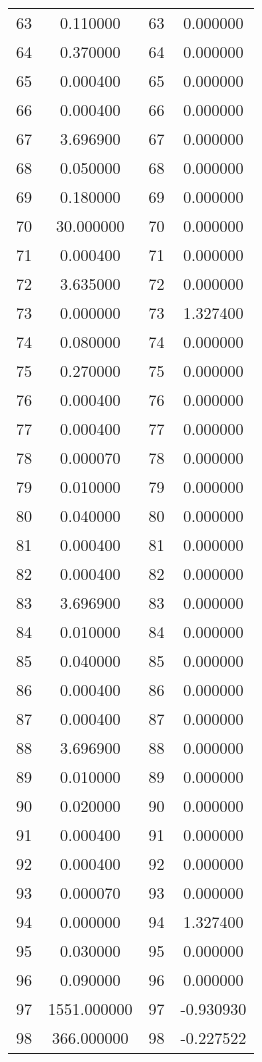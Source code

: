 \documentclass[12pt]{article}
\begin{document}
\begin{longtable}{@{}cccc@{}}
63 & 0.110000 & 63 & 0.000000 \\
64 & 0.370000 & 64 & 0.000000 \\
65 & 0.000400 & 65 & 0.000000 \\
66 & 0.000400 & 66 & 0.000000 \\
67 & 3.696900 & 67 & 0.000000 \\
68 & 0.050000 & 68 & 0.000000 \\
69 & 0.180000 & 69 & 0.000000 \\
70 & 30.000000 & 70 & 0.000000 \\
71 & 0.000400 & 71 & 0.000000 \\
72 & 3.635000 & 72 & 0.000000 \\
73 & 0.000000 & 73 & 1.327400 \\
74 & 0.080000 & 74 & 0.000000 \\
75 & 0.270000 & 75 & 0.000000 \\
76 & 0.000400 & 76 & 0.000000 \\
77 & 0.000400 & 77 & 0.000000 \\
78 & 0.000070 & 78 & 0.000000 \\
79 & 0.010000 & 79 & 0.000000 \\
80 & 0.040000 & 80 & 0.000000 \\
81 & 0.000400 & 81 & 0.000000 \\
82 & 0.000400 & 82 & 0.000000 \\
83 & 3.696900 & 83 & 0.000000 \\
84 & 0.010000 & 84 & 0.000000 \\
85 & 0.040000 & 85 & 0.000000 \\
86 & 0.000400 & 86 & 0.000000 \\
87 & 0.000400 & 87 & 0.000000 \\
88 & 3.696900 & 88 & 0.000000 \\
89 & 0.010000 & 89 & 0.000000 \\
90 & 0.020000 & 90 & 0.000000 \\
91 & 0.000400 & 91 & 0.000000 \\
92 & 0.000400 & 92 & 0.000000 \\
93 & 0.000070 & 93 & 0.000000 \\
94 & 0.000000 & 94 & 1.327400 \\
95 & 0.030000 & 95 & 0.000000 \\
96 & 0.090000 & 96 & 0.000000 \\
97 & 1551.000000 & 97 & -0.930930 \\
98 & 366.000000 & 98 & -0.227522 \\

\end{longtable}
\end{document}
